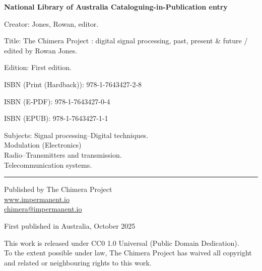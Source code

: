 \newpage
\thispagestyle{empty}

\vspace*{5cm}

\begin{flushleft}

{\small
\textbf{National Library of Australia Cataloguing-in-Publication entry}

\vspace{0.5cm}

Creator: Jones, Rowan, editor.

\vspace{0.3cm}

Title: The Chimera Project : digital signal processing, past, present \& future / edited by Rowan Jones.

\vspace{0.3cm}

Edition: First edition.

\vspace{0.3cm}

\item ISBN (Print (Hardback)): 978-1-7643427-2-8
\item ISBN (E-PDF): 978-1-7643427-0-4
\item ISBN (EPUB): 978-1-7643427-1-1

\vspace{0.3cm}

Subjects: Signal processing--Digital techniques.\\
\hspace*{2em}Modulation (Electronics)\\
\hspace*{2em}Radio--Transmitters and transmission.\\
\hspace*{2em}Telecommunication systems.

\vspace{1cm}

\rule{0.3\textwidth}{0.4pt}

\vspace{0.5cm}

Published by The Chimera Project\\
\url{www.impermanent.io}\\
\href{mailto:chimera@impermanent.io}{chimera@impermanent.io}

\vspace{0.5cm}

First published in Australia, October 2025

\vspace{0.5cm}

This work is released under CC0 1.0 Universal (Public Domain Dedication).\\
To the extent possible under law, The Chimera Project has waived all copyright\\
and related or neighbouring rights to this work.

}

\end{flushleft}

\newpage
